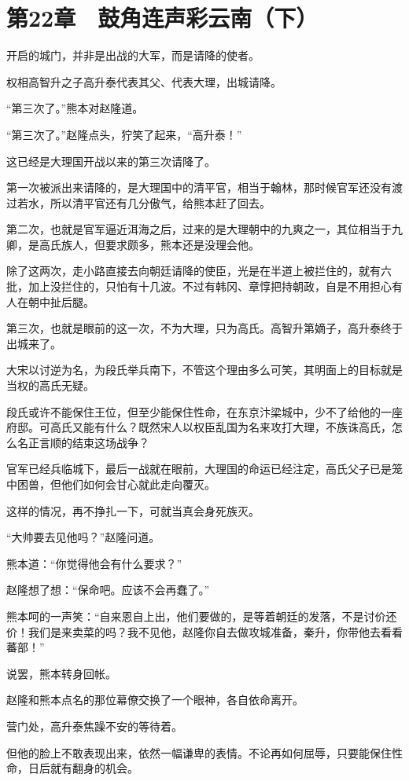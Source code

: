 \section{第22章　鼓角连声彩云南（下）}

开启的城门，并非是出战的大军，而是请降的使者。

权相高智升之子高升泰代表其父、代表大理，出城请降。

“第三次了。”熊本对赵隆道。

“第三次了。”赵隆点头，狞笑了起来，“高升泰！”

这已经是大理国开战以来的第三次请降了。

第一次被派出来请降的，是大理国中的清平官，相当于翰林，那时候官军还没有渡过若水，所以清平官还有几分傲气，给熊本赶了回去。

第二次，也就是官军逼近洱海之后，过来的是大理朝中的九爽之一，其位相当于九卿，是高氏族人，但要求颇多，熊本还是没理会他。

除了这两次，走小路直接去向朝廷请降的使臣，光是在半道上被拦住的，就有六批，加上没拦住的，只怕有十几波。不过有韩冈、章惇把持朝政，自是不用担心有人在朝中扯后腿。

第三次，也就是眼前的这一次，不为大理，只为高氏。高智升第嫡子，高升泰终于出城来了。

大宋以讨逆为名，为段氏举兵南下，不管这个理由多么可笑，其明面上的目标就是当权的高氏无疑。

段氏或许不能保住王位，但至少能保住性命，在东京汴梁城中，少不了给他的一座府邸。可高氏又能有什么？既然宋人以权臣乱国为名来攻打大理，不族诛高氏，怎么名正言顺的结束这场战争？

官军已经兵临城下，最后一战就在眼前，大理国的命运已经注定，高氏父子已是笼中困兽，但他们如何会甘心就此走向覆灭。

这样的情况，再不挣扎一下，可就当真会身死族灭。

“大帅要去见他吗？”赵隆问道。

熊本道：“你觉得他会有什么要求？”

赵隆想了想：“保命吧。应该不会再蠢了。”

熊本呵的一声笑：“自来恩自上出，他们要做的，是等着朝廷的发落，不是讨价还价！我们是来卖菜的吗？我不见他，赵隆你自去做攻城准备，秦升，你带他去看看蕃部！”

说罢，熊本转身回帐。

赵隆和熊本点名的那位幕僚交换了一个眼神，各自依命离开。

营门处，高升泰焦躁不安的等待着。

但他的脸上不敢表现出来，依然一幅谦卑的表情。不论再如何屈辱，只要能保住性命，日后就有翻身的机会。

